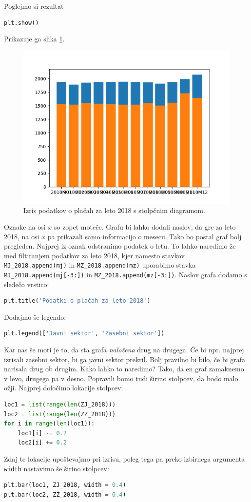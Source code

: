 Poglejmo si rezultat
\begin{lstlisting}[language=Python]
plt.show()
\end{lstlisting}
Prikazuje ga slika \ref{img:plt6}.
\begin{figure}
    \includegraphics[width=\linewidth]{img/plt6.png}
    \caption{Izris podatkov o plačah za leto 2018 s stolpčnim diagramom.}
    \label{img:plt6}
\end{figure}
Oznake na osi $x$ so zopet moteče. Grafu bi lahko dodali naslov, da gre za leto 2018, na osi $x$ pa prikazali samo informacijo o mesecu. Tako bo postal graf bolj pregleden. Najprej iz oznak odstranimo podatek o letu. To lahko naredimo že med filtiranjem podatkov za leto 2018, kjer namesto stavkov \texttt{MJ\_2018.append(mj)} in \texttt{MZ\_2018.append(mz)} uporabimo stavka \texttt{MJ\_2018.append(mj[-3:])} in \texttt{MZ\_2018.append(mz[-3:])}. Naslov grafa dodamo s sledečo vrstico:
\begin{lstlisting}[language=Python]
plt.title('Podatki o plačah za leto 2018')
\end{lstlisting}
Dodajmo še legendo:
\begin{lstlisting}[language=Python, showstringspaces=false]
plt.legend(['Javni sektor', 'Zasebni sektor'])
\end{lstlisting}

Kar nas še moti je to, da sta grafa \emph{naložena} drug na drugega. Če bi npr. najprej izrisali zasebni sektor, bi ga javni sektor prekril. Bolj pravilno bi bilo, če bi grafa narisala drug ob drugim. Kako lahko to naredimo? Tako, da en graf zamaknemo v levo, drugega pa v desno. Popravili bomo tudi širino stolpcev, da bodo malo ožji. Najprej določimo lokacije stolpcev:
\begin{lstlisting}[language=Python]
loc1 = list(range(len(ZJ_2018)))
loc2 = list(range(len(ZZ_2018)))
for i in range(len(loc1)):
    loc1[i] -= 0.2
    loc2[i] += 0.2
\end{lstlisting}
Zdaj te lokacije upoštevajmo pri izrisu, poleg tega pa preko izbirnega argumenta \texttt{width} nastavimo še širino stolpcev:
\begin{lstlisting}[language=Python]
plt.bar(loc1, ZJ_2018, width = 0.4)
plt.bar(loc2, ZZ_2018, width = 0.4)
\end{lstlisting}

